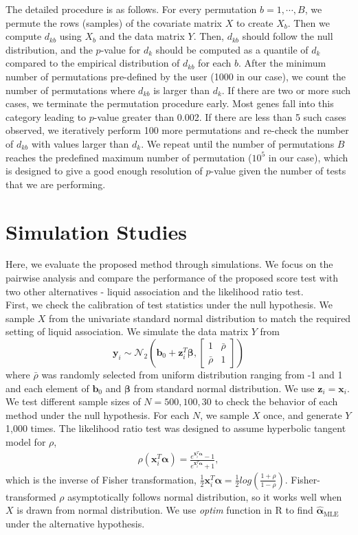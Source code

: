 \documentclass[aap,authoryear, preprint]{imsart}
\numberwithin{equation}{section}
\theoremstyle{plain}
\begin{document}
The detailed procedure is as follows. For every permutation $b = 1, \cdots, B$, we permute the rows (samples) of the covariate matrix $X$ to create $X_b$. Then we compute $d_{kb}$ using $X_b$ and the data matrix $Y$. Then, $d_{kb}$ should follow the null distribution, and the $p$-value for $d_k$ should be computed as a quantile of $d_k$ compared to the empirical distribution of $d_{kb}$ for each $b$. After the minimum number of permutations pre-defined by the user (1000 in our case), we count the number of permutations where $d_{kb}$ is larger than $d_k$. If there are two or more such cases, we terminate the permutation procedure early. Most genes fall into this category leading to $p$-value greater than 0.002. If there are less than 5 such cases observed, we iteratively perform 100 more permutations and re-check the number of $d_{kb}$ with values larger than $d_k$. We repeat until the number of permutations $B$ reaches the predefined maximum number of permutation ($10^5$ in our case), which is designed to give a good enough resolution of $p$-value given the number of tests that we are performing.

\section{Simulation Studies} \label{simulations}
Here, we evaluate the proposed method through simulations. We focus on the pairwise analysis and compare the performance of the proposed score test with two other alternatives - liquid association and the likelihood ratio test. \\

First, we check the calibration of test statistics under the null hypothesis. We sample $X$ from the univariate standard normal distribution to match the required setting of liquid association. We simulate the data matrix $Y$ from 
$$\bm{y}_i \sim \mathcal{N}_2\left(\bm{b}_0 + \bm{z}_i^T\bm{\beta}, \begin{bmatrix} 1 & \bar{\rho} \\ \bar{\rho} & 1 \end{bmatrix}  \right)$$ 
where $\bar{\rho}$ was randomly selected from uniform distribution ranging from -1 and 1 and each element of $\bm{b}_0$ and $\bm{\beta}$ from standard normal distribution. We use $\bm{z}_i = \bm{x}_i$. We test different sample sizes of $N = 500, 100, 30$ to check the behavior of each method under the null hypothesis. For each $N$, we sample $X$ once, and generate $Y$ 1,000 times. The likelihood ratio test was designed to assume hyperbolic tangent model for $\rho$,
\begin{align}
    \rho(\bm{x}_i^T\bm{\alpha}) = \frac{e^{\bm{x}_i^T\bm{\alpha}}-1}{e^{\bm{x}_i^T\bm{\alpha}}+1},
    \label{eq:data_generating_fisher}
\end{align}
which is the inverse of Fisher transformation, 
$\frac{1}{2} \bm{x}_i^T\bm{\alpha} = \frac{1}{2}log \left(\frac{1+\rho}{1-\rho}\right)$. Fisher-transformed $\rho$ asymptotically follows normal distribution, so it works well when $X$ is drawn from normal distribution. We use \textit{optim} function in R to find $\hat{\bm{\alpha}}_{\text{MLE}}$ under the alternative hypothesis. \\
\end{document}
